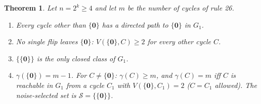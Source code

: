 \documentclass[10pt,a4paper]{article}
\newtheorem{theorem}{Theorem}[section]
\newcommand{\zero}{\mathbf{0}}                %
\newcommand{\Sel}{\mathcal{S}}                %
\newcommand{\Gone}{G_1}                       %
\begin{document}
\begin{theorem}\label{26:thm:main}
Let $n=2^k\ge4$ and let $m$ be the number of cycles of rule 26.
\begin{enumerate}[label=\textup{(\alph*)},nosep,leftmargin=*]
\item Every cycle other than $\{\zero\}$ has a directed path to $\{\zero\}$ in $\Gone$.
\item No single flip leaves $\{\zero\}$: $V(\{\zero\},C)\ge2$ for every other cycle $C$.
\item $\{\{\zero\}\}$ is the only closed class of $\Gone$.
\item $\gamma(\{\zero\})=m-1$. For $C\ne\{\zero\}$: $\gamma(C)\ge m$, and $\gamma(C)=m$ iff $C$ is reachable in
$\Gone$ from a cycle $C_1$ with $V(\{\zero\},C_1)=2$ ($C=C_1$ allowed). The noise-selected set is
$\Sel=\{\{\zero\}\}$.
\end{enumerate}
\end{theorem}
\end{document}
